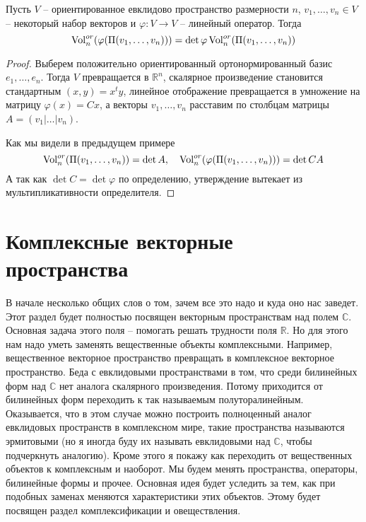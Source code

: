 \begin{claim}
Пусть $V$ -- ориентированное евклидово пространство размерности $n$, $v_1,\ldots,v_n\in V$ -- некоторый набор векторов и $\varphi\colon V\to V$ -- линейный оператор.
Тогда 
\[
\operatorname{Vol}^{or}_n(\varphi(\Pi(v_1,\ldots,v_n))) = \det \varphi \operatorname{Vol}^{or}_n(\Pi(v_1,\ldots,v_n))
\]
\end{claim}
\begin{proof}
Выберем положительно ориентированный ортонормированный базис $e_1,\ldots,e_n$.
Тогда $V$ превращается в $\mathbb R^n$, скалярное произведение становится стандартным $(x, y) = x^t y$, линейное отображение превращается в умножение на матрицу $\varphi(x) = Cx$, а векторы $v_1,\ldots,v_n$ расставим по столбцам матрицы $A = (v_1|\ldots|v_n)$.

Как мы видели в предыдущем примере
\[
\operatorname{Vol}^{or}_n(\Pi(v_1,\ldots,v_n)) = \det A,\quad
\operatorname{Vol}^{or}_n(\varphi(\Pi(v_1,\ldots,v_n))) = \det CA
\]
А так как $\det C = \det \varphi$ по определению, утверждение вытекает из мультипликативности определителя.
\end{proof}


\newpage
\section{Комплексные векторные пространства}

В начале несколько общих слов о том, зачем все это надо и куда оно нас заведет.
Этот раздел будет полностью посвящен векторным пространствам над полем $\mathbb C$.
Основная задача этого поля -- помогать решать трудности поля $\mathbb R$.
Но для этого нам надо уметь заменять вещественные объекты комплексными.
Например, вещественное векторное пространство превращать в комплексное векторное пространство.
Беда с евклидовыми пространствами в том, что среди билинейных форм над $\mathbb C$ нет аналога скалярного произведения.
Потому приходится от билинейных форм переходить к так называемым полуторалинейным.
Оказывается, что в этом случае можно построить полноценный аналог евклидовых пространств в комплексном мире, такие пространства называются эрмитовыми (но я иногда буду их называть евклидовыми над $\mathbb C$, чтобы подчеркнуть аналогию).
Кроме этого я покажу как переходить от вещественных объектов к комплексным и наоборот.
Мы будем менять пространства, операторы, билинейные формы и прочее.
Основная идея будет уследить за тем, как при подобных заменах меняются характеристики этих объектов.
Этому будет посвящен раздел комплексификации и овеществления.

